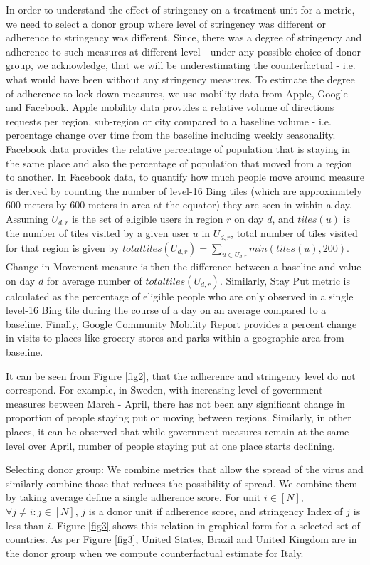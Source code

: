 \documentclass[fleqn,10pt]{wlscirep}
\begin{document}
    In order to understand the effect of stringency on a treatment unit for a metric, we need to select a donor group where level of stringency was different or adherence to stringency was different. Since, there was a degree of stringency and adherence to such measures at different level - under any possible choice of donor group, we acknowledge, that we will be underestimating the counterfactual - i.e. what would have been without any stringency measures. To estimate the degree of adherence to lock-down measures, we use mobility data from Apple, Google and Facebook. Apple mobility data provides a relative volume of directions requests per region, sub-region or city compared to a baseline volume - i.e. percentage change over time from the baseline including weekly seasonality. Facebook data provides the relative percentage of population that is staying in the same place and also the percentage of population that moved from a region to another.  In Facebook data, to quantify how much people move around measure is derived by counting the number of level-16 Bing tiles (which are approximately 600 meters by 600 meters in area at the equator) they are seen in within a day. Assuming $U_{d,r}$ is the set of eligible users in region $r$ on day $d$, and $tiles(u)$ is the number of tiles visited by a given user $u$ in $U_{d,r}$, total number of tiles visited for that region is given by $totaltiles(U_{d,r}) = \sum_{u \in U_{d,r}} min(tiles(u), 200)$. Change in Movement measure is then the difference between a baseline and value on day $d$ for average number of $totaltiles(U_{d,r})$. Similarly, Stay Put metric is calculated as the percentage of eligible people who are only observed in a single level-16 Bing tile during the course of a day on an average compared to a baseline. Finally, Google Community Mobility Report provides a percent change in visits to places like grocery stores and parks within a geographic area from baseline.
    
    It can be seen from Figure \ref{fig2}, that the adherence  and stringency level do not correspond. For example, in Sweden, with increasing level of government measures between March - April, there has not been any significant change in proportion of people staying put or moving between regions. Similarly, in other places, it can be observed that while government measures remain at the same level over April, number of people staying put at one place starts declining. 
    
    Selecting donor group: We combine metrics that allow the spread of the virus and similarly combine those that reduces the possibility of spread. We combine them by taking average define a single adherence score. For unit $i \in [N]$, $\forall j \neq i : j \in [N]$, $j$ is a donor unit if adherence score, and stringency Index of $j$ is less than $i$. Figure \ref{fig3} shows this relation in graphical form for a selected set of countries. As per Figure \ref{fig3}, United States, Brazil and United Kingdom are in the donor group when we compute counterfactual estimate for Italy. 
    
\end{document}
